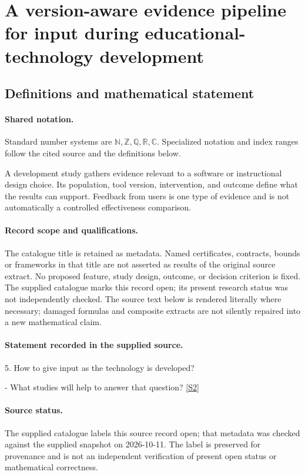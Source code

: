 \documentclass[11pt]{article}
\newcommand{\sref}[2]{\hyperlink{source:#1:#2}{[S#2]}}
\begin{document}
\section{A version-aware evidence pipeline for input during educational-technology development}\label{statement}

\subsection{Definitions and mathematical statement}

\paragraph{Shared notation.}Standard number systems are $\mathbb N,\mathbb Z,\mathbb Q,\mathbb R,\mathbb C$. Specialized notation and index ranges follow the cited source and the definitions below.


A development study gathers evidence relevant to a software or instructional design choice. Its population, tool version, intervention, and outcome define what the results can support. Feedback from users is one type of evidence and is not automatically a controlled effectiveness comparison.
\paragraph{Record scope and qualifications.}
The catalogue title is retained as metadata. Named certificates, contracts, bounds or frameworks in that title are not asserted as results of the original source extract.
No proposed feature, study design, outcome, or decision criterion is fixed. The supplied catalogue marks this record open; its present research status was not independently checked.
The source text below is rendered literally where necessary; damaged formulas and composite extracts are not silently repaired into a new mathematical claim.
\paragraph{Statement recorded in the supplied source.}
5. How to give input as the technology is developed?

- What studies will help to answer that question? \sref{statement}{2}
\paragraph{Source status.}
The supplied catalogue labels this source record open; that metadata was checked against the supplied snapshot on 2026-10-11. The label is preserved for provenance and is not an independent verification of present open status or mathematical correctness.
\end{document}
